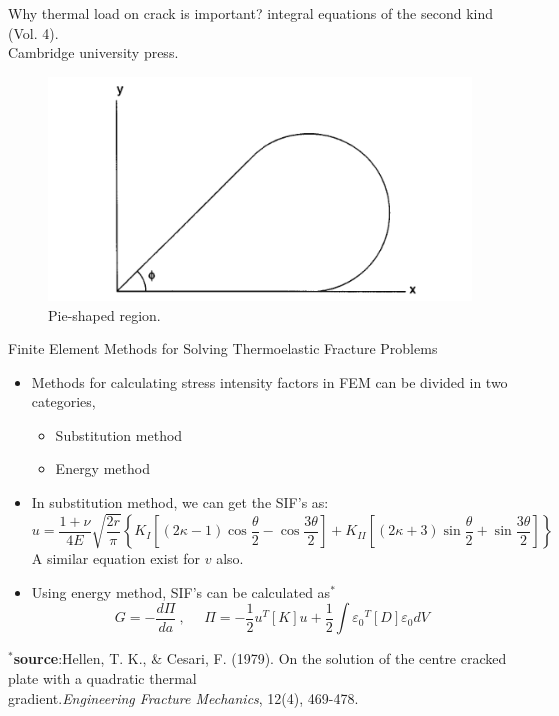 \documentclass{beamer}
\begin{document}
\begin{frame}[t,fragile]{Why thermal load on crack is important?}
{    integral equations of the second kind} (Vol. 4). \\
  \hspace{10pt}
    Cambridge university press.
\begin{figure}
    \centering
    \vspace{-50pt}
    \includegraphics[width=.3\textwidth]{pie.png}
    \caption{\footnotesize Pie-shaped region.}
    \label{pie}
\end{figure}
 
\end{frame}
\begin{frame}[t,fragile]{Finite Element Methods for Solving Thermoelastic Fracture Problems}
    \vspace{-.4cm}
    \begin{itemize}
        \item Methods for calculating stress intensity factors in FEM can be divided in two categories,
            \begin{itemize}
                \item Substitution method 
                \item Energy method 
            \end{itemize}
        \item In substitution method, we can get the SIF's as:
            \footnotesize
            $$ u=\frac{1+\nu}{4E}\sqrt{\frac{2r}{\pi}}\left\{ K_I\left[ (2\kappa -1)\cos \frac{\theta}{2}-\cos \frac{3\theta}{2} \right]+K_{II}\left[ (2\kappa +3)\sin\frac{\theta}{2}+\sin\frac{3\theta}{2} \right] \right\}$$
            \normalsize
A similar equation exist for $v$ also. 
        \item Using energy method, SIF's can be calculated as$^\ast$ 
            \footnotesize
$$G=-\frac{d\Pi}{da}\ ,\ \ \ \ \ \  
\Pi=-\frac{1}{2}{u}^T[K]{u}+\frac{1}{2}\int{\varepsilon_0}^T[D]{\varepsilon_0}dV$$
 
    \end{itemize}
    \vspace{-.1cm}
   \tiny
   \hspace{15pt}
   $^\ast$\textbf{source}:Hellen, T. K., \& Cesari, F. (1979). On the solution of the centre cracked plate with a quadratic thermal\\ 
   \vspace{-7pt}
   \hspace{15pt}
   gradient.\emph{Engineering Fracture Mechanics}, 12(4), 469-478.
\end{frame} 
\end{document}
